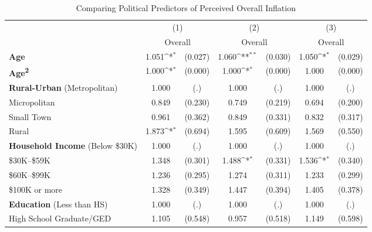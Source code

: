 \begin{table}[htbp]\centering
\def\sym#1{\ifmmode^{#1}\else\(^{#1}\)\fi}
\caption{Comparing Political Predictors of Perceived Overall Inflation}
\begin{tabular}{l*{3}{cc}}
\hline\hline
                    &\multicolumn{2}{c}{(1)}           &\multicolumn{2}{c}{(2)}           &\multicolumn{2}{c}{(3)}           \\
                    &\multicolumn{2}{c}{Overall}       &\multicolumn{2}{c}{Overall}       &\multicolumn{2}{c}{Overall}       \\
\hline
\textbf{Age}        &       1.051\sym{*}  &     (0.027)&       1.060\sym{**} &     (0.030)&       1.050\sym{*}  &     (0.029)\\
\textbf{Age\textsuperscript{2}}&       1.000\sym{*}  &     (0.000)&       1.000\sym{*}  &     (0.000)&       1.000         &     (0.000)\\
\textbf{Rural-Urban} (Metropolitan)&       1.000         &         (.)&       1.000         &         (.)&       1.000         &         (.)\\
Micropolitan        &       0.849         &     (0.230)&       0.749         &     (0.219)&       0.694         &     (0.200)\\
Small Town          &       0.961         &     (0.362)&       0.849         &     (0.331)&       0.832         &     (0.317)\\
Rural               &       1.873\sym{*}  &     (0.694)&       1.595         &     (0.609)&       1.569         &     (0.550)\\
\textbf{Household Income} (Below \$30K)&       1.000         &         (.)&       1.000         &         (.)&       1.000         &         (.)\\
\$30K--\$59K        &       1.348         &     (0.301)&       1.488\sym{*}  &     (0.331)&       1.536\sym{*}  &     (0.340)\\
\$60K--\$99K        &       1.236         &     (0.295)&       1.274         &     (0.311)&       1.233         &     (0.299)\\
\$100K or more      &       1.328         &     (0.349)&       1.447         &     (0.394)&       1.405         &     (0.378)\\
\textbf{Education} (Less than HS)&       1.000         &         (.)&       1.000         &         (.)&       1.000         &         (.)\\
High School Graduate/GED&       1.105         &     (0.548)&       0.957         &     (0.518)&       1.149         &     (0.598)\\

\end{tabular}
\end{table}

